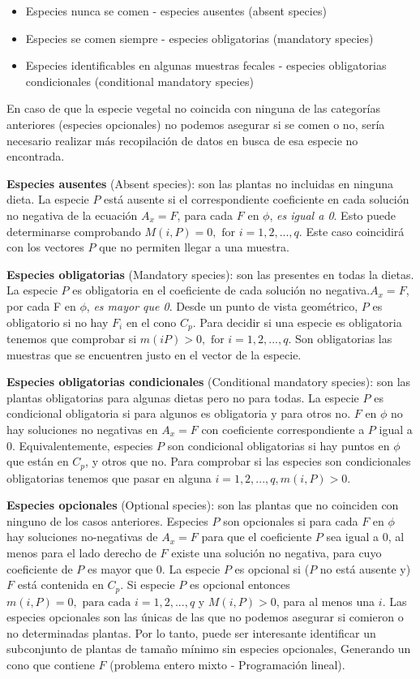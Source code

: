 \documentclass[11pt]{article}
\begin{document}
\begin{itemize}
    \item Especies nunca se comen - especies ausentes (absent species)
    \item Especies se comen siempre - especies obligatorias (mandatory species)
    \item Especies identificables en algunas muestras fecales - especies obligatorias condicionales (conditional mandatory species)
\end{itemize}

En caso de que la especie vegetal no coincida con ninguna de las categorías anteriores (especies opcionales) no podemos asegurar si se comen o no, sería necesario realizar más recopilación de datos en busca de esa especie no encontrada.

\textbf{Especies ausentes} (Absent species): son las plantas no incluidas en ninguna dieta. La especie $P$ está ausente si el correspondiente coeficiente en cada solución no negativa de la ecuación $A_x=F$, para cada $F$ en $\phi$, \textit{es igual a 0}. Esto puede determinarse comprobando $M(i,P) = 0, \text{ for } i =1,2,...,q$. Este caso coincidirá con los vectores $P$ que no permiten llegar a una muestra.

\textbf{Especies obligatorias} (Mandatory species): son las presentes en todas la dietas. La especie $P$ es obligatoria en el coeficiente de cada solución no negativa.$A_x=F$, por cada F en $\phi$, \textit{es mayor que 0}. Desde un punto de vista geométrico, $P$ es obligatorio si no hay $F_i$ en el cono $C_p$. Para decidir si una especie es obligatoria tenemos que comprobar si $m(iP)>0, \text{ for } i = 1,2,...,q$. Son obligatorias las muestras que se encuentren justo en el vector de la especie.

\textbf{Especies obligatorias condicionales} (Conditional mandatory species): son las plantas obligatorias para algunas dietas pero no para todas. La especie $P$ es condicional obligatoria si para algunos es obligatoria y para otros no. $F$ en $\phi$ no hay soluciones no negativas en $A_x=F$ con coeficiente correspondiente a $P$ igual a $0$. Equivalentemente, especies $P$ son condicional obligatorias si hay puntos en $\phi$ que están en $C_p$, y otros que no. Para comprobar si las especies son condicionales obligatorias tenemos que pasar en alguna $i=1,2,...,q, m(i,P)>0$. 

\textbf{Especies opcionales} (Optional species): son las plantas que no coinciden con ninguno de los casos anteriores. Especies $P$ son opcionales si para cada $F$ en $\phi$ hay soluciones no-negativas de $A_x=F$ para que el coeficiente $P$ sea igual a $0$, al menos para el lado derecho de $F$ existe una solución no negativa, para cuyo coeficiente de $P$ es mayor que $0$. La especie $P$ es opcional si ($P$ no está ausente y) $F$ está contenida en $C_p$. Si especie $P$ es opcional entonces $m(i,P)=0, \text{ para cada } i=1,2,...,q$ y $M(i,P)>0$, para al menos una $i$. 
Las especies opcionales son las únicas de las que no podemos asegurar si comieron o no determinadas plantas. Por lo tanto, puede ser interesante identificar un subconjunto de plantas de tamaño mínimo sin especies opcionales, Generando un cono que contiene $F$ (problema entero mixto - Programación lineal).
\end{document}

